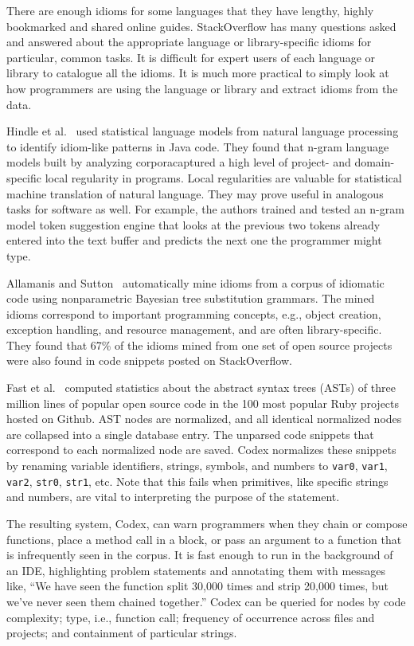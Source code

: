 There are enough idioms for some languages that they have lengthy, highly bookmarked and shared online guides. StackOverflow has many questions asked and answered about the appropriate language or library-specific idioms for particular, common tasks. It is difficult for expert users of each language or library to catalogue all the idioms. It is much more practical to simply look at how programmers are using the language or library and extract idioms from the data.

Hindle et al.~\cite{Hindle2012} used statistical language models from natural language processing to identify idiom-like patterns in Java code. They found that n-gram language models built by analyzing corporacaptured a high level of project- and domain-specific local regularity in programs. Local regularities are valuable for statistical machine translation of natural language. They may prove useful in analogous tasks for software as well. For example, the authors trained and tested an n-gram model token suggestion engine that looks at the previous two tokens already entered into the text buffer and predicts the next one the programmer might type.

Allamanis and Sutton~\cite{allamanis2014mining} automatically mine idioms from a corpus of idiomatic code using nonparametric Bayesian tree substitution grammars. The mined idioms correspond to important programming concepts, e.g., object creation, exception handling, and resource management, and are often library-specific. They found that 67\% of the idioms mined from one set of open source projects were also found in code snippets posted on StackOverflow.

Fast et al.~\cite{codex} computed statistics about the abstract syntax trees (ASTs) of three million lines of popular open source code in the 100 most popular Ruby projects hosted on Github. AST nodes are normalized, and all identical normalized nodes are collapsed into a single database entry. The unparsed code snippets that correspond to each normalized node are saved. Codex normalizes these snippets by renaming variable identifiers, strings, symbols, and numbers to \texttt{var0}, \texttt{var1}, \texttt{var2}, \texttt{str0}, \texttt{str1}, etc. Note that this fails when primitives, like specific strings and numbers, are vital to interpreting the purpose of the statement.

The resulting system, Codex, can warn programmers when they chain or compose functions, place a method call in a block, or pass an argument to a function that is infrequently seen in the corpus. It is fast enough to run in the background of an IDE, highlighting problem statements and annotating them with messages like, ``We have seen the function split 30,000 times and strip 20,000 times, but we've never seen them chained together.'' Codex can be queried for nodes by code complexity; type, i.e., function call; frequency of occurrence across files and projects; and containment of particular strings.

